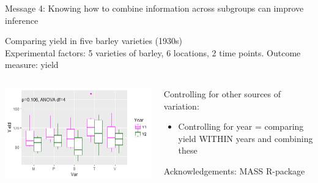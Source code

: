 \documentclass{beamer}
\begin{document}
\begin{frame}{Message 4: Knowing how to combine information across subgroups  can improve inference}
 
  
 Comparing yield in five barley varieties (1930s) \\
 Experimental factors: 5 varieties of barley, 6 locations, 2 time points. Outcome measure: yield
  \begin{columns}
    \begin{column}{0.5\textwidth}
	\begin{center}
	\includegraphics[width=\textwidth]{Figures/message4b}
	\end{center}
    \end{column}
    
    \begin{column}{0.5\textwidth}
    \begin{block}{Controlling for other sources of variation:}
      \begin{itemize}
	\item Controlling for year = comparing yield WITHIN years and combining these
      \end{itemize}
      \end{block}
      \tiny Acknowledgements: MASS R-package
    \end{column}
  \end{columns}
   
\end{frame}
\end{document}
